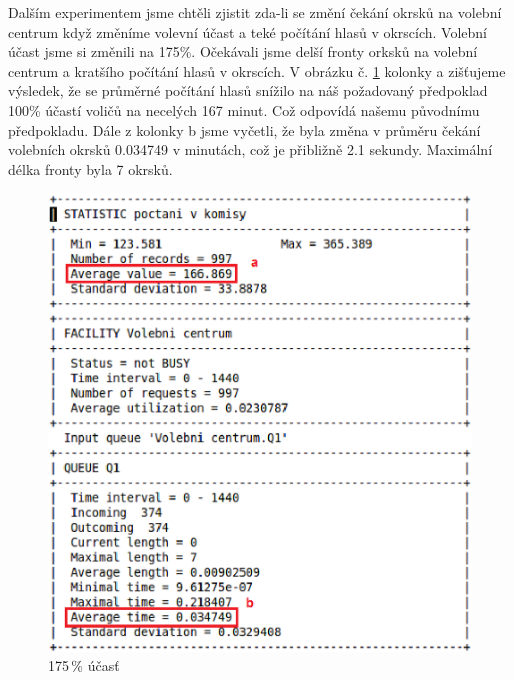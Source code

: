 \documentclass[12pt,a4paper,titlepage,final]{article}
\begin{document}
\newline
\newline
\newpage
Dalším experimentem jsme chtěli zjistit zda-li se změní čekání okrsků na volební centrum když změníme volevní účast a teké počítání hlasů v okrscích. Volební účast jsme si změnili na 175\%. Očekávali jsme delší fronty orksků na volební centrum a kratšího počítání hlasů v okrscích. V obrázku č. \ref{obr4} kolonky a zišťujeme výsledek, že se průměrné počítání hlasů snížilo na náš požadovaný předpoklad 100\% účastí voličů na necelých 167 minut. Což odpovídá našemu původnímu předpokladu. Dále z kolonky b jsme vyčetli, že byla změna v průměru čekání volebních okrsků 0.034749 v minutách, což je přibližně 2.1 sekundy. Maximální délka fronty byla 7 okrsků. \newline
\newline
\begin{figure}[h]

\begin{center}

\includegraphics[scale=0.7]{img/1_75.eps} 
\caption{175\,\% účasť}
\label{obr4}

\end{center}

\end{figure}
\end{document}
